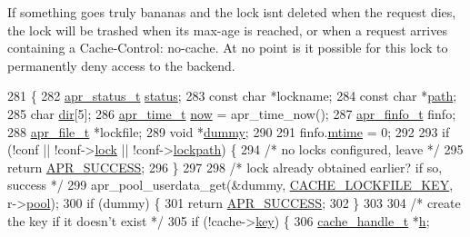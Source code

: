 If something goes truly bananas and the lock isn\textquotesingle{}t deleted when the request dies, the lock will be trashed when its max-\/age is reached, or when a request arrives containing a Cache-\/\+Control\+: no-\/cache. At no point is it possible for this lock to permanently deny access to the backend. 
\begin{DoxyCode}
281 \{
282     \hyperlink{group__apr__errno_gaa5105fa83cc322f09382292db8b47593}{apr\_status\_t} \hyperlink{group__APACHE__CORE__HTTPD_ga6e27f49150e9a14580fb313cc2777e00}{status};
283     \textcolor{keyword}{const} \textcolor{keywordtype}{char} *lockname;
284     \textcolor{keyword}{const} \textcolor{keywordtype}{char} *\hyperlink{group__APACHE__CORE__CONFIG_gab559cff0ba49c0f92a0dc777d5730496}{path};
285     \textcolor{keywordtype}{char} \hyperlink{group__APACHE__CORE__DAEMON_ga6d902c83b02c43071b972ed0416729bc}{dir}[5];
286     \hyperlink{group__apr__time_gadb4bde16055748190eae190c55aa02bb}{apr\_time\_t} \hyperlink{group__MOD__CACHE_ga33504014e188d5d7506173cc14fb5801}{now} = apr\_time\_now();
287     \hyperlink{structapr__finfo__t}{apr\_finfo\_t} finfo;
288     \hyperlink{structapr__file__t}{apr\_file\_t} *lockfile;
289     \textcolor{keywordtype}{void} *\hyperlink{group__APACHE__CORE__LISTEN_gafd856f29d11272d954fe05b9c1ca84dd}{dummy};
290 
291     finfo.\hyperlink{structapr__finfo__t_afc3bec0f6b3b10160428ba5602a41c60}{mtime} = 0;
292 
293     \textcolor{keywordflow}{if} (!conf || !conf->\hyperlink{structcache__server__conf_ab459a77dbc1bbba26a954336d34d136e}{lock} || !conf->\hyperlink{structcache__server__conf_ab8f9316567111d3366fcc1edfaf0bc8c}{lockpath}) \{
294         \textcolor{comment}{/* no locks configured, leave */}
295         \textcolor{keywordflow}{return} \hyperlink{group__apr__errno_ga9ee311b7bf1c691dc521d721339ee2a6}{APR\_SUCCESS};
296     \}
297 
298     \textcolor{comment}{/* lock already obtained earlier? if so, success */}
299     apr\_pool\_userdata\_get(&dummy, \hyperlink{group__Cache__util_ga18f46c3a4173d016f51fce82d596fec7}{CACHE\_LOCKFILE\_KEY}, r->\hyperlink{structrequest__rec_aa0a0c16f9a9ab3901cdb3f3c9c9d83d0}{pool});
300     \textcolor{keywordflow}{if} (dummy) \{
301         \textcolor{keywordflow}{return} \hyperlink{group__apr__errno_ga9ee311b7bf1c691dc521d721339ee2a6}{APR\_SUCCESS};
302     \}
303 
304     \textcolor{comment}{/* create the key if it doesn't exist */}
305     \textcolor{keywordflow}{if} (!cache->\hyperlink{structcache__request__rec_a564726b5f7e5dc4fee2fb01d178677b4}{key}) \{
306         \hyperlink{structcache__handle}{cache\_handle\_t} *\hyperlink{group__apr__hash_ga0d6dcb41ca5e794b318df5f6fd273ee2}{h};

\end{DoxyCode}
